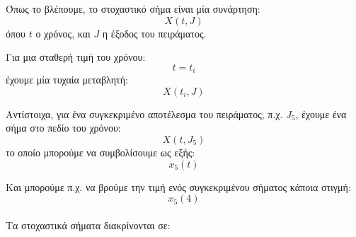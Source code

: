 \documentclass[11pt,a4paper,notitlepage,fleqn,draft]{article}
\begin{document}
Όπως το βλέπουμε, το στοχαστικό σήμα είναι μία συνάρτηση:
\[
X(t,J)
\]
όπου \( t \) ο χρόνος, και \( J \) η έξοδος του πειράματος.

Για μια σταθερή τιμή του χρόνου:
\[
t=t_i
\]
έχουμε μία τυχαία μεταβλητή:
\[
X(t_i,J)
\]

Αντίστοιχα, για ένα συγκεκριμένο αποτέλεσμα του πειράματος, π.χ.
\( J_5 \), έχουμε ένα σήμα στο πεδίο του χρόνου:
\[
X(t,J_5)
\]
το οποίο μπορούμε να συμβολίσουμε ως εξής:
\[
x_5(t)
\]

Και μπορούμε π.χ. να βρούμε την τιμή ενός συγκεκριμένου
σήματος κάποια στιγμή:
\[
x_5(4)
\]

\paragraph{}
Τα στοχαστικά σήματα διακρίνονται σε:
\end{document}
